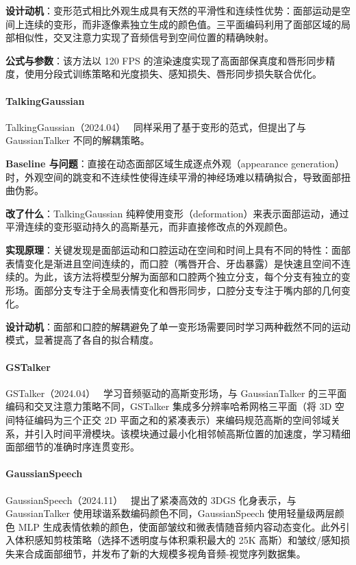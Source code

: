 \textbf{设计动机}：变形范式相比外观生成具有天然的平滑性和连续性优势：面部运动是空间上连续的变形，而非逐像素独立生成的颜色值。三平面编码利用了面部区域的局部相似性，交叉注意力实现了音频信号到空间位置的精确映射。

\textbf{公式与参数}：该方法以 120 FPS 的渲染速度实现了高面部保真度和唇形同步精度，使用分段式训练策略和光度损失、感知损失、唇形同步损失联合优化。

\paragraph{TalkingGaussian}

TalkingGaussian（2024.04）~\cite{2404_15264} 同样采用了基于变形的范式，但提出了与 GaussianTalker 不同的解耦策略。

\textbf{Baseline 与问题}：直接在动态面部区域生成逐点外观（appearance generation）时，外观空间的跳变和不连续性使得连续平滑的神经场难以精确拟合，导致面部扭曲伪影。

\textbf{改了什么}：TalkingGaussian 纯粹使用变形（deformation）来表示面部运动，通过平滑连续的变形驱动持久的高斯基元，而非直接修改点的外观颜色。

\textbf{实现原理}：关键发现是面部运动和口腔运动在空间和时间上具有不同的特性：面部表情变化是渐进且空间连续的，而口腔（嘴唇开合、牙齿暴露）是快速且空间不连续的。为此，该方法将模型分解为面部和口腔两个独立分支，每个分支有独立的变形场。面部分支专注于全局表情变化和唇形同步，口腔分支专注于嘴内部的几何变化。

\textbf{设计动机}：面部和口腔的解耦避免了单一变形场需要同时学习两种截然不同的运动模式，显著提高了各自的拟合精度。

\paragraph{GSTalker}

GSTalker（2024.04）~\cite{2404_19040} 学习音频驱动的高斯变形场，与 GaussianTalker 的三平面编码和交叉注意力策略不同，GSTalker 集成多分辨率哈希网格三平面（将 3D 空间特征编码为三个正交 2D 平面之和的紧凑表示）来编码规范高斯的空间邻域关系，并引入时间平滑模块。该模块通过最小化相邻帧高斯位置的加速度，学习精细面部细节的准确时序连贯变形。

\paragraph{GaussianSpeech}

GaussianSpeech（2024.11）~\cite{2411_18675} 提出了紧凑高效的 3DGS 化身表示，与 GaussianTalker 使用球谐系数编码颜色不同，GaussianSpeech 使用轻量级两层颜色 MLP 生成表情依赖的颜色，使面部皱纹和微表情随音频内容动态变化。此外引入体积感知剪枝策略（选择不透明度与体积乘积最大的 25K 高斯）和皱纹/感知损失来合成面部细节，并发布了新的大规模多视角音频-视觉序列数据集。

